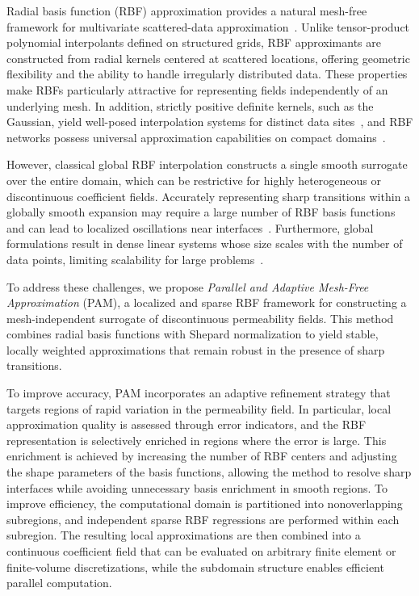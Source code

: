 \documentclass[final,1p,times]{elsarticle}
\theoremstyle{plain}
\theoremstyle{definition}
\theoremstyle{remark}
\begin{document}
Radial basis function (RBF) approximation provides a natural mesh-free framework for multivariate scattered-data approximation~\cite{powell1987rbf,buhmann2003rbf,wendland2005scattered}. Unlike tensor-product polynomial interpolants defined on structured grids, RBF approximants are constructed from radial kernels centered at scattered locations, offering geometric flexibility and the ability to handle irregularly distributed data. These properties make RBFs particularly attractive for representing fields independently of an underlying mesh. In addition, strictly positive definite kernels, such as the Gaussian, yield well-posed interpolation systems for distinct data sites~\cite{micchelli1986interpolation}, and RBF networks possess universal approximation capabilities on compact domains~\cite{park1991universal}.

However, classical global RBF interpolation constructs a single smooth surrogate over the entire domain, which can be restrictive for highly heterogeneous or discontinuous coefficient fields. Accurately representing sharp transitions within a globally smooth expansion may require a large number of RBF basis functions and can lead to localized oscillations near interfaces~\cite{fornberg2007runge}. Furthermore, global formulations result in dense linear systems whose size scales with the number of data points, limiting scalability for large problems~\cite{wendland2005scattered,majdisova2017biggeo}.

To address these challenges, we propose \emph{Parallel and Adaptive Mesh-Free Approximation} (PAM), a localized and sparse RBF framework for constructing a mesh-independent surrogate of discontinuous permeability fields. This method combines radial basis functions with Shepard normalization to yield stable, locally weighted approximations that remain robust in the presence of sharp transitions.

To improve accuracy, PAM incorporates an adaptive refinement strategy that targets regions of rapid variation in the permeability field. In particular, local approximation quality is assessed through error indicators, and the RBF representation is selectively enriched in regions where the error is large. This enrichment is achieved by increasing the number of RBF centers and adjusting the shape parameters of the basis functions, allowing the method to resolve sharp interfaces while avoiding unnecessary basis enrichment in smooth regions. To improve efficiency, the computational domain is partitioned into nonoverlapping subregions, and independent sparse RBF regressions are performed within each subregion. The resulting local approximations are then combined into a continuous coefficient field that can be evaluated on arbitrary finite element or finite-volume discretizations, while the subdomain structure enables efficient parallel computation.
\end{document}
